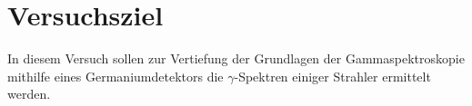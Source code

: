 \section{Versuchsziel}
\label{sec:versuchsziel}

In diesem Versuch sollen zur Vertiefung der Grundlagen der Gammaspektroskopie mithilfe eines Germaniumdetektors die $\gamma$-Spektren einiger Strahler ermittelt werden.